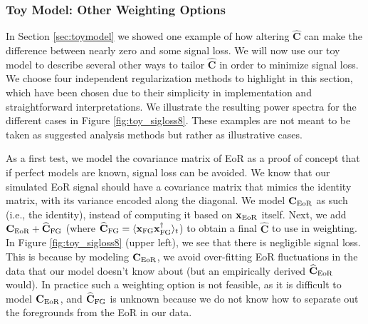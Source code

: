 \documentclass[preprint2,numberedappendix,tighten]{aastex6}  %
\begin{document}
\subsubsection{Toy Model: Other Weighting Options}
\label{sec:otherweight}

In Section \ref{sec:toymodel} we showed one example of how altering $\widehat{\textbf{C}}$ can 
make the difference between nearly zero and some signal loss. We will now use our toy model to describe several other ways to tailor $\widehat{\textbf{C}}$ 
in order to minimize signal loss. We choose four independent regularization methods to highlight in this section, which have 
been chosen due to their simplicity in implementation and straightforward interpretations. We illustrate the resulting power 
spectra for the different cases in Figure \ref{fig:toy_sigloss8}.
These examples are not meant to be taken as suggested analysis methods but rather as illustrative cases. 

As a first test, we model the covariance matrix of EoR as a proof of concept that if perfect models are known, signal loss can be 
avoided. We know that our simulated EoR signal should have a covariance matrix that mimics the identity matrix, with its 
variance encoded along the diagonal. We model $\textbf{C}_{\rm EoR}$ as such (i.e., the identity), instead of computing it based on $\textbf{x}
_{\rm EoR}$ itself. Next, we add $\textbf{C}_{\rm EoR} + \widehat{\textbf{C}}_{\rm FG}$ (where $\widehat{\textbf{C}}_{\rm FG} = \langle\textbf{x}_{\rm FG}
\textbf{x}_{\rm FG}^{\dagger}\rangle_{t}$) to obtain a final $\widehat{\textbf{C}}$ to use in weighting. In Figure \ref{fig:toy_sigloss8} (upper 
left), we see that there is negligible signal loss. This is because by modeling $\textbf{C}_{\rm EoR}$, we avoid over-fitting EoR fluctuations in the data that our model doesn't know about (but an empirically derived $\widehat{\textbf{C}}_{\rm EoR}$ would). 
In practice such a weighting option is not feasible, as it is difficult to model $\textbf{C}_{\rm EoR}$, and $\widehat{\textbf{C}}_{\rm FG}$ is unknown because we do not know how to separate out the foregrounds from the EoR in our data.
\end{document}
